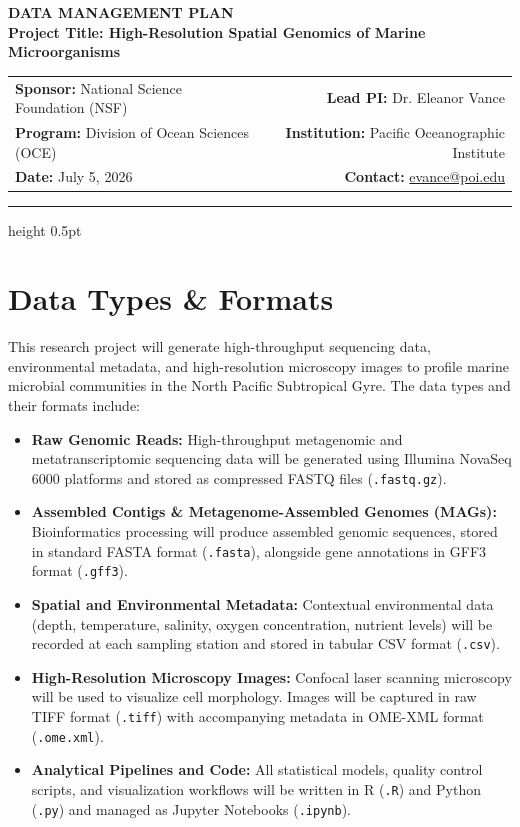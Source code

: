 \documentclass[10pt,letterpaper]{article}
\begin{document}
\color{neutraldark}

\begin{center}
    {\color{accent}\Large\bfseries DATA MANAGEMENT PLAN} \\[0.5em]
    {\large\bfseries Project Title: High-Resolution Spatial Genomics of Marine Microorganisms} \\[0.3em]
    \vspace{0.2em}
    \begin{tabularx}{\linewidth}{X r}
        \textbf{Sponsor:} National Science Foundation (NSF) & \textbf{Lead PI:} Dr. Eleanor Vance \\
        \textbf{Program:} Division of Ocean Sciences (OCE) & \textbf{Institution:} Pacific Oceanographic Institute \\
        \textbf{Date:} July 5, 2026 & \textbf{Contact:} \href{mailto:evance@poi.edu}{evance@poi.edu}
    \end{tabularx}
\end{center}
\vspace{0.4em}
\hrule height 0.5pt
\vspace{0.8em}

\section{Data Types \& Formats}
This research project will generate high-throughput sequencing data, environmental metadata, and high-resolution microscopy images to profile marine microbial communities in the North Pacific Subtropical Gyre. The data types and their formats include:
\begin{itemize}
    \item \textbf{Raw Genomic Reads:} High-throughput metagenomic and metatranscriptomic sequencing data will be generated using Illumina NovaSeq 6000 platforms and stored as compressed FASTQ files (\texttt{.fastq.gz}).
    \item \textbf{Assembled Contigs \& Metagenome-Assembled Genomes (MAGs):} Bioinformatics processing will produce assembled genomic sequences, stored in standard FASTA format (\texttt{.fasta}), alongside gene annotations in GFF3 format (\texttt{.gff3}).
    \item \textbf{Spatial and Environmental Metadata:} Contextual environmental data (depth, temperature, salinity, oxygen concentration, nutrient levels) will be recorded at each sampling station and stored in tabular CSV format (\texttt{.csv}).
    \item \textbf{High-Resolution Microscopy Images:} Confocal laser scanning microscopy will be used to visualize cell morphology. Images will be captured in raw TIFF format (\texttt{.tiff}) with accompanying metadata in OME-XML format (\texttt{.ome.xml}).
    \item \textbf{Analytical Pipelines and Code:} All statistical models, quality control scripts, and visualization workflows will be written in R (\texttt{.R}) and Python (\texttt{.py}) and managed as Jupyter Notebooks (\texttt{.ipynb}).
\end{itemize}
\end{document}
